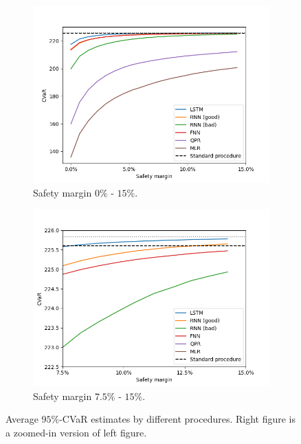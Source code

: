 \begin{figure}[ht!]
    \centering
    \begin{subfigure}{0.48\textwidth}
        \includegraphics[width=\textwidth]{./project2/figures/CVaR/allLN.png}
        \caption{Safety margin $0\%$ - $15\%$.}
        \label{subfig2:AllSafetyMargin}
    \end{subfigure}
    \begin{subfigure}{0.48\textwidth}
        \includegraphics[width=\textwidth]{./project2/figures/CVaR/zoomedLN.png}
        \caption{Safety margin $7.5\%$ - $15\%$.}
        \label{subfig2:ZoomedSafetyMargin}
    \end{subfigure}
    \caption{Average $95\%$-CVaR estimates by different procedures. Right figure is a zoomed-in version of left figure.} 
    \label{fig2:CVaR95}
\end{figure}


